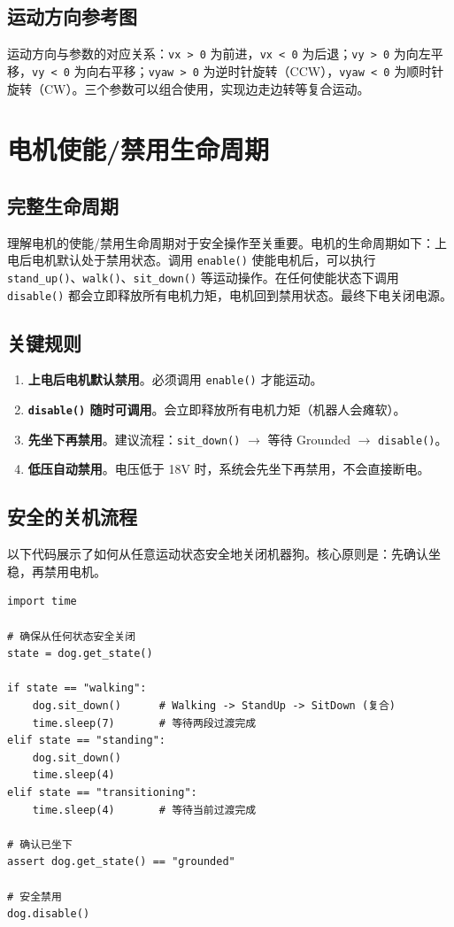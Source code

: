 \documentclass[a4paper,11pt,openany]{book}
\begin{document}
\subsection{运动方向参考图}

运动方向与参数的对应关系：\texttt{vx > 0} 为前进，\texttt{vx < 0} 为后退；\texttt{vy > 0} 为向左平移，\texttt{vy < 0} 为向右平移；\texttt{vyaw > 0} 为逆时针旋转（CCW），\texttt{vyaw < 0} 为顺时针旋转（CW）。三个参数可以组合使用，实现边走边转等复合运动。

\section{电机使能/禁用生命周期}

\subsection{完整生命周期}

理解电机的使能/禁用生命周期对于安全操作至关重要。电机的生命周期如下：上电后电机默认处于禁用状态。调用 \texttt{enable()} 使能电机后，可以执行 \texttt{stand\_up()}、\texttt{walk()}、\texttt{sit\_down()} 等运动操作。在任何使能状态下调用 \texttt{disable()} 都会立即释放所有电机力矩，电机回到禁用状态。最终下电关闭电源。

\subsection{关键规则}

\begin{enumerate}[nosep]
  \item \textbf{上电后电机默认禁用}。必须调用 \texttt{enable()} 才能运动。
  \item \textbf{\texttt{disable()} 随时可调用}。会立即释放所有电机力矩（机器人会瘫软）。
  \item \textbf{先坐下再禁用}。建议流程：\texttt{sit\_down()} $\to$ 等待 Grounded $\to$ \texttt{disable()}。
  \item \textbf{低压自动禁用}。电压低于 18V 时，系统会先坐下再禁用，不会直接断电。
\end{enumerate}

\subsection{安全的关机流程}

以下代码展示了如何从任意运动状态安全地关闭机器狗。核心原则是：先确认坐稳，再禁用电机。

\begin{lstlisting}[style=python]
import time

# 确保从任何状态安全关闭
state = dog.get_state()

if state == "walking":
    dog.sit_down()      # Walking -> StandUp -> SitDown (复合)
    time.sleep(7)       # 等待两段过渡完成
elif state == "standing":
    dog.sit_down()
    time.sleep(4)
elif state == "transitioning":
    time.sleep(4)       # 等待当前过渡完成

# 确认已坐下
assert dog.get_state() == "grounded"

# 安全禁用
dog.disable()
\end{lstlisting}
\end{document}
